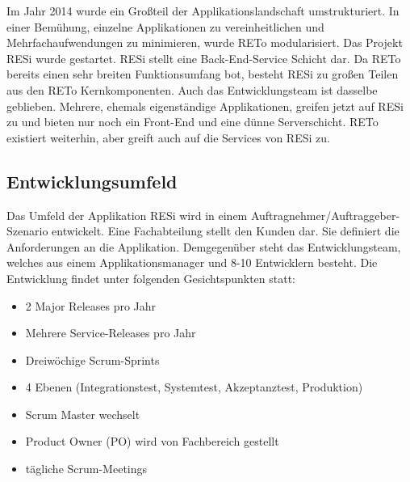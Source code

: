 Im Jahr 2014 wurde ein Großteil der Applikationslandschaft umstrukturiert. In einer Bemühung, einzelne Applikationen zu vereinheitlichen und Mehrfachaufwendungen zu minimieren, wurde RETo modularisiert. Das Projekt RESi wurde gestartet. RESi stellt eine Back-End-Service Schicht dar. Da RETo bereits einen sehr breiten Funktionsumfang bot, besteht RESi zu großen Teilen aus den RETo Kernkomponenten. Auch das Entwicklungsteam ist dasselbe geblieben. Mehrere, ehemals eigenständige Applikationen, greifen jetzt auf RESi zu und bieten nur noch ein Front-End und eine dünne Serverschicht. RETo existiert weiterhin, aber greift auch auf die Services von RESi zu.

\subsection{Entwicklungsumfeld}
Das Umfeld der Applikation RESi wird in einem Auftragnehmer/Auftraggeber-Szenario entwickelt. Eine Fachabteilung stellt den Kunden dar. Sie definiert die Anforderungen an die Applikation. Demgegenüber steht das Entwicklungsteam, welches aus einem Applikationsmanager und 8-10 Entwicklern besteht. Die Entwicklung findet unter folgenden Gesichtspunkten statt:

\begin{itemize}
\item 2 Major Releases pro Jahr
\item Mehrere Service-Releases pro Jahr
\item Dreiwöchige Scrum-Sprints
\item 4 Ebenen (Integrationstest, Systemtest, Akzeptanztest, Produktion)
\item Scrum Master wechselt
\item Product Owner (PO) wird von Fachbereich gestellt
\item tägliche Scrum-Meetings
\end{itemize} 

